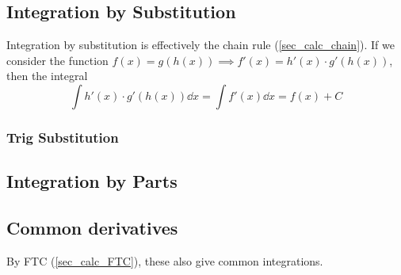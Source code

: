 \documentclass[fleqn,a4paper,11pt]{article}
\begin{document}
    \subsection{Integration by Substitution} \label{sec_calc_substitution}

    Integration by substitution is effectively the chain rule
    (\ref{sec_calc_chain}). If we consider the function
    \(f(x) = g(h(x)) \implies f'(x) = h'(x) \cdot g'(h(x))\), then the integral
    \begin{equation}
    \int h'(x) \cdot g'(h(x)) \dd{x} = \int f'(x) \dd{x} = f(x) + C
    \end{equation}

    \subsubsection{Trig Substitution} \label{sec_calc_trig_substitution}

    \subsection{Integration by Parts}

    \subsection{Common derivatives} \label{calc:common}


    By FTC (\ref{sec_calc_FTC}), these also give common integrations.

\end{document}
